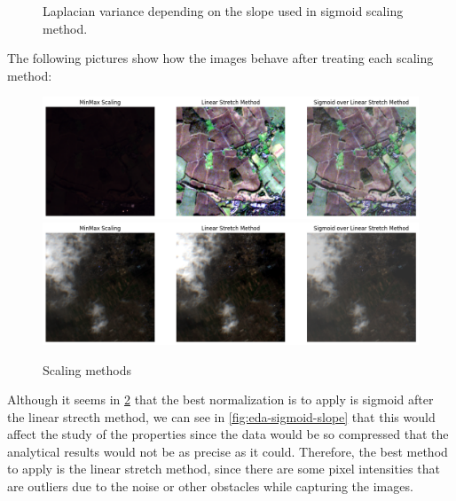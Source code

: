 \documentclass[11pt, a4paper]{article}
\begin{document}
\begin{itemize}
\begin{figure}[H]
			\caption{Laplacian variance depending on the slope used in sigmoid scaling method.}
			\label{fig:eda-laplacian-vars-slope}
		\end{figure}
	\end{itemize}
	The following pictures show how the images behave after treating each scaling method:
	\begin{figure}[H]
		\centering
		\includegraphics[width=15cm]{imgs/eda/scaled-methods-1}\\
		\includegraphics[width=15cm]{imgs/eda/scaled-methods-2}
		\caption{Scaling methods}
		\label{fig:scaling-methods}
	\end{figure}
	Although it seems in \ref{fig:scaling-methods} that the best normalization is to apply is sigmoid after the linear strecth method, we can see in \ref{fig:eda-sigmoid-slope}  that this would affect the study of the properties since the data would be so compressed that the analytical results would not be as precise as it could. Therefore, the best method to apply is the linear stretch method, since there are some pixel intensities that are outliers due to the noise or other obstacles while capturing the images.
\end{document}
